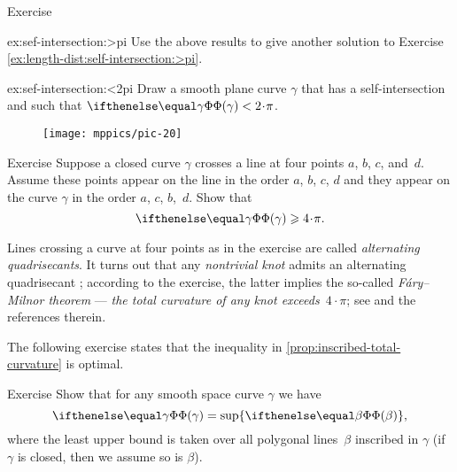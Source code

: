 \pagebreak%

\begin{thm}{Exercise}\label{ex:sef-intersection}


\begin{subthm}{ex:sef-intersection:>pi}  
Use the above results to give another solution to Exercise \ref{ex:length-dist:self-intersection:>pi}. 
\end{subthm}

\begin{subthm}{ex:sef-intersection:<2pi}
Draw a smooth plane curve $\gamma$ that has a self-intersection and such that $\tc\gamma<2\cdot\pi$.
\end{subthm}

\end{thm}

\begin{wrapfigure}{r}{30 mm}
\vskip-2mm
\centering
\texttt{[image: mppics/pic-20]}
\vskip0mm
\end{wrapfigure}

\begin{thm}{Exercise}\label{ex:quadrisecant}
Suppose a closed curve $\gamma$ crosses a line at four points $a$, $b$, $c$, and~$d$.
Assume these points appear on the line in the order $a$, $b$, $c$, $d$
and they appear on the curve $\gamma$ in the order $a$, $c$, $b$,~$d$.
Show that 
\[\tc\gamma\ge 4\cdot\pi.\]

\end{thm}

Lines crossing a curve at four points as in the exercise are called \emph{alternating quadrisecants}.
It turns out that any {}\emph{nontrivial knot} admits an alternating quadrisecant \cite{denne};
according to the exercise, the latter implies the so-called {}\emph{F\'ary--Milnor theorem} --- \textit{the total curvature of any knot exceeds~$4\cdot \pi$}; see \cite{petrunin-stadler} and the references therein.

The following exercise states that the inequality in \ref{prop:inscribed-total-curvature} is optimal.

\begin{thm}{Exercise}\label{ex:total-curvature=}
Show that for any smooth space curve $\gamma$ we have 
\[\tc\gamma=\sup\{\tc\beta\},\]
where the least upper bound is taken over all polygonal lines~$\beta$ inscribed in $\gamma$
(if $\gamma$ is closed, then we assume so is $\beta$).
\end{thm}

